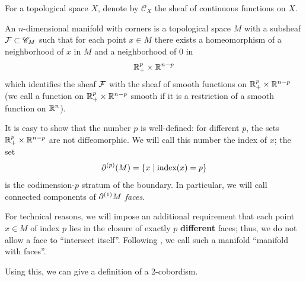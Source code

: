 For a topological space $X$, denote by $\mathscr{C}_X$ the sheaf of continuous
functions on $X$.%


\begin{definition}\label{d:manifold-corners}
  An $n$-dimensional manifold with corners is a topological space $M$ with a
  subsheaf $\mathcal{F}\subset \mathscr{C}_M$ such that for each point $x\in M$ there
  exists a homeomorphism of a neighborhood of $x$ in $M$ and a neighborhood of
  $0$ in
  $$
    \mathbb{R}_+^p\times \mathbb{R}^{n-p}
  $$
  which identifies the sheaf $\mathcal{F}$ with the sheaf of smooth functions
  on $\mathbb{R}_+^p\times \mathbb{R}^{n-p}$ (we call a function on $\mathbb{R}_+^p\times
  \mathbb{R}^{n-p}$ smooth if it is a restriction of a
  smooth function on $\mathbb{R}^n$).
\end{definition}
It is easy to show that the number $p$ is well-defined: for different $p$,
the sets $\mathbb{R}_+^p\times \mathbb{R}^{n-p}$ are not diffeomorphic. We will call this
number the index of $x$; the set
$$
  \partial^{(p)}(M)=\{x\; | \; \text{index}(x)=p\}
$$
is the codimension-$p$ stratum of the boundary. In particular, we will call
connected components of $\partial^{(1)}M$ \emph{faces}.

For technical reasons, we will impose an additional requirement that each point
$x\in M$ of index $p$ lies in the closure of exactly $p$ \textbf{different} faces;
thus,
we do not allow a face to ``intersect itself''. Following
, we call such a manifold ``manifold with faces''.

Using this, we can give a definition of a 2-cobordism.

